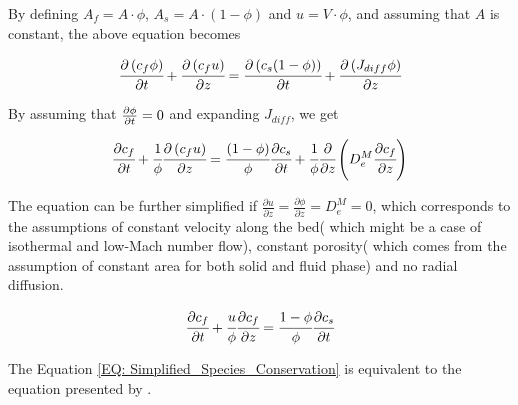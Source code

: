 \documentclass[../Article_Model_Parameters.tex]{subfiles}
\begin{document}
	By defining $A_f = A \cdot \phi$, $A_s = A \cdot \left( 1-\phi \right)$ and $u=V \cdot \phi$, and assuming that $A$ is constant, the above equation becomes
	
	{\footnotesize
		\begin{equation}
			\cfrac{\partial \left( c_f \phi \right)}{\partial t} + \cfrac{\partial \left( c_f u\right)}{\partial z} = \cfrac{\partial \left( c_s (1-\phi) \right) }{\partial t} + \cfrac{\partial \left( J_{diff} \phi \right) }{\partial z}
		\end{equation}
	}

	By assuming that ${\footnotesize \frac{\partial \phi}{\partial t}=0}$ and expanding $J_{diff}$, we get
	
	{\footnotesize
		\begin{equation}
			\cfrac{\partial c_f}{\partial t} + \cfrac{1}{\phi} \cfrac{\partial \left( c_f u\right)}{\partial z} = \cfrac{ (1-\phi)}{\phi} \cfrac{\partial c_s }{\partial t} + \cfrac{1}{\phi} \cfrac{\partial}{\partial z} \left( D_e^M \cfrac{\partial c_f}{\partial z} \right)
		\end{equation}
	}
	
	The equation can be further simplified if $\frac{\partial u}{\partial z} = \frac{\partial \phi}{\partial z} = D_e^M = 0$, which corresponds to the assumptions of constant velocity along the bed( which might be a case of isothermal and low-Mach number flow), constant porosity( which comes from the assumption of constant area for both solid and fluid phase) and no radial diffusion.
	
	{\footnotesize
		\begin{equation}
			\cfrac{\partial c_f}{\partial t} + \cfrac{u}{\phi} \cfrac{\partial c_f}{\partial z}  = \cfrac{1-\phi}{\phi} \cfrac{\partial c_s}{\partial t} 
			\label{EQ: Simplified_Species_Conservation}
		\end{equation}
	}

	The Equation \ref{EQ: Simplified_Species_Conservation} is equivalent to the equation presented by \citet{Reverchon1996}.
	
\end{document}
